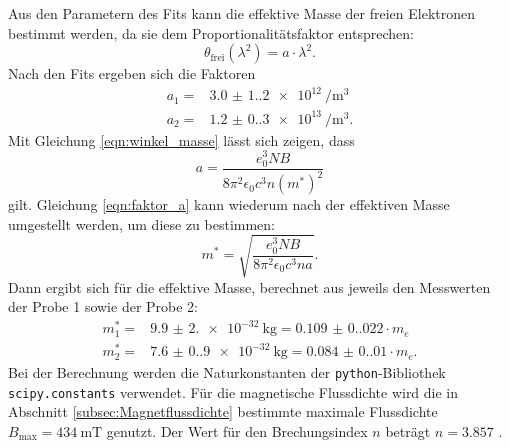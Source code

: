 \noindent
Aus den Parametern des Fits kann die effektive Masse der freien Elektronen bestimmt werden,
da sie dem Proportionalitätsfaktor entsprechen:
\begin{equation*}
  \theta_{\text{frei}} (\lambda^{2}) = a \cdot \lambda^{2}.
\end{equation*}
Nach den Fits ergeben sich die Faktoren
\begin{align}
  a_{1} = & \SI{3.0(1.2)e12}{\per\meter\cubed} \\
  a_{2} = & \SI{1.2(0.3)e13}{\per\meter\cubed}.
\end{align}
Mit Gleichung \ref{eqn:winkel_masse} lässt sich zeigen, dass
\begin{equation}
  a = \frac{e_{0}^{3} N B}{8 \pi^{2} \epsilon_{0} c^{3} n (m^{*})^{2}}
  \label{eqn:faktor_a}
\end{equation}
gilt. Gleichung \ref{eqn:faktor_a} kann wiederum nach der effektiven Masse
umgestellt werden, um diese zu bestimmen:
\begin{equation}
  m^{*} = \sqrt{\frac{e_{0}^{3} N B}{8 \pi^{2} \epsilon_{0} c^{3} n a}}.
  \label{eqn:effektive_masse_aus_a}
\end{equation}
Dann ergibt sich für die effektive Masse, berechnet aus jeweils den
Messwerten der Probe 1 sowie der Probe 2:
\begin{align}
  m_{1}^{*} = & \SI{9.9(2.0)e-32}{\kilo\gram} = \num{0.109(0.022)} \cdot m_{e} \\
  m_{2}^{*} = & \SI{7.6(0.9)e-32}{\kilo\gram} = \num{0.084(0.010)} \cdot m_{e}.
\end{align}
Bei der Berechnung werden die Naturkonstanten der \texttt{python}-Bibliothek
\texttt{scipy.constants} verwendet. Für die magnetische Flussdichte wird die
in Abschnitt \ref{subsec:Magnetflussdichte} bestimmte maximale Flussdichte
$B_{\text{max}} = \SI{434}{\milli\tesla}$ genutzt. Der Wert für den
Brechungsindex $n$ beträgt $n = 3.857$ \cite{Brechungsindex}.

